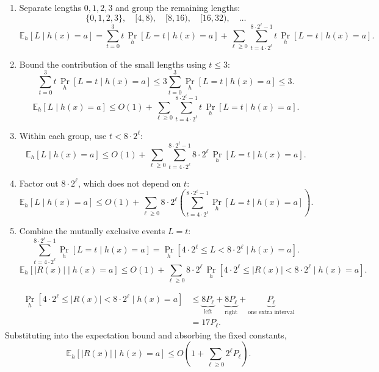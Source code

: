 \documentclass[12pt,a4paper]{article}
\begin{document}
\begin{enumerate}
\item Separate lengths $0,1,2,3$ and group the remaining lengths:
\[
\{0,1,2,3\},\quad[4,8),\quad[8,16),\quad[16,32),\quad\ldots
\]
\[
\mathbb E_h[L\mid h(x)=a]
=\sum_{t=0}^{3}t\,\Pr_h[L=t\mid h(x)=a]
+\sum_{\ell\geq0}
 \sum_{t=4\cdot2^\ell}^{8\cdot2^\ell-1}t\,\Pr_h[L=t\mid h(x)=a].
\]

\item Bound the contribution of the small lengths using $t\leq3$:
\[
\sum_{t=0}^{3}t\,\Pr_h[L=t\mid h(x)=a]
\leq3\sum_{t=0}^{3}\Pr_h[L=t\mid h(x)=a]
\leq3.
\]
\[
\mathbb E_h[L\mid h(x)=a]
\leq O(1)+\sum_{\ell\geq0}
 \sum_{t=4\cdot2^\ell}^{8\cdot2^\ell-1}t\,\Pr_h[L=t\mid h(x)=a].
\]

\item Within each group, use $t<8\cdot2^\ell$:
\[
\mathbb E_h[L\mid h(x)=a]
\leq O(1)+\sum_{\ell\geq0}
 \sum_{t=4\cdot2^\ell}^{8\cdot2^\ell-1}
 8\cdot2^\ell\,\Pr_h[L=t\mid h(x)=a].
\]

\item Factor out $8\cdot2^\ell$, which does not depend on $t$:
\[
\mathbb E_h[L\mid h(x)=a]
\leq O(1)+\sum_{\ell\geq0}8\cdot2^\ell
 \left(\sum_{t=4\cdot2^\ell}^{8\cdot2^\ell-1}\Pr_h[L=t\mid h(x)=a]\right).
\]

\item Combine the mutually exclusive events $L=t$:
\[
\sum_{t=4\cdot2^\ell}^{8\cdot2^\ell-1}\Pr_h[L=t\mid h(x)=a]
=\Pr_h\!\left[4\cdot2^\ell\leq L<8\cdot2^\ell\mid h(x)=a\right].
\]
\[
\mathbb E_h[|R(x)|\mid h(x)=a]
\leq O(1)+\sum_{\ell\geq0}8\cdot2^\ell\,
 \Pr_h\!\left[4\cdot2^\ell\leq|R(x)|<8\cdot2^\ell\mid h(x)=a\right].
\]
\end{enumerate}

\[
\begin{aligned}
\Pr_h[4\cdot2^\ell\leq|R(x)|<8\cdot2^\ell\mid h(x)=a]
&\leq
\underbrace{8P_\ell}_{\text{left}}
+\underbrace{8P_\ell}_{\text{right}}
+\underbrace{P_\ell}_{\text{one extra interval}}\\
&=17P_\ell.
\end{aligned}
\]
Substituting into the expectation bound and absorbing the fixed constants,
\[
\boxed{
\mathbb E_h[|R(x)|\mid h(x)=a]
\leq O\!\left(1+\sum_{\ell\geq0}2^\ell P_\ell\right).
}
\]
\end{document}
